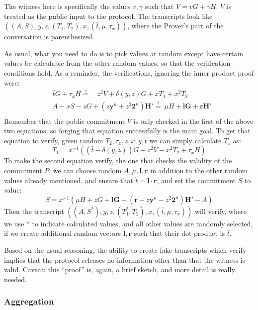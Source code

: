 \documentclass[10pt,a4paper]{article}
\begin{document}
The witness here is specifically the values $v, \gamma$ such that $V = vG + \gamma H$. $V$ is treated as
the public input to the protocol. The transcripts look like $((A, S), y, z, (T_1, T_2), x, (\hat{t}, \mu, \tau_x))$, where the
Prover's part of the conversation is parenthesized.

As usual, what you need to do is to pick values at random except have
certain values be calculable from the other random values, so that the
verification conditions hold. As a reminder, the verifications, ignoring
the inner product proof were:
\begin{align*}
& \hat{t}G + \tau_x H \stackrel{?}{=} \quad z^2V + \delta(y, z) G + xT_1 + x^2T_2 \\
&  A + xS -zG + \left(z\textbf{y}^n + z^2\textbf{2}^n\right)\textbf{H}' \stackrel{?}{=} \ \mu H + \textbf{lG} + \textbf{rH}' \\
\end{align*}
Remember that the public commitment $V$ is only checked in the first of the
above two equations; so forging that equation successfully is the main
goal. To get that equation to verify, given random $T_2, \tau_x, z, x, y, \hat{t}$ we can simply
calculate $T_1$ as:
\[T_1 = x^{-1}\left((\hat{t}-\delta(y,z))G -z^2 V - x^2T_2 + \tau_x H\right)\]
To make the second equation verify, the one that checks the validity of
the commitment $P$, we can choose random $A, \mu, \textbf{l}, \textbf{r}$ in addition to the other random
values already mentioned, and ensure that $\hat{t} = \textbf{l}\cdot \textbf{r}$, and set the commitment $S$ to
value:
\[S = x^{-1}\left(\mu H + zG + \textbf{lG} + (\textbf{r} -z\textbf{y}^n -z^2\textbf{2}^n)\textbf{H}' -A\right)\]
Then the transcript $((A, S^*), y, z, (T_1^*, T_2), x, (\hat{t}, \mu, \tau_x))$ will verify, where we use * to indicate calculated
values, and all other values are randomly selected, if we create
additional random vectors $\mathbf{l}, \mathbf{r}$ such that their dot product is $\hat{t}$.

Based on the usual reasoning, the ability to create fake transcripts
which verify implies that the protocol releases no information other
than that the witness is valid. Caveat: this ``proof'' is, again, a
brief sketch, and more detail is really needed.

\hypertarget{aggregation}{%
\subsubsection[Aggregation]{\texorpdfstring{\protect\hypertarget{anchor-66}{}{}Aggregation}{Aggregation}}\label{aggregation}}
\end{document}
